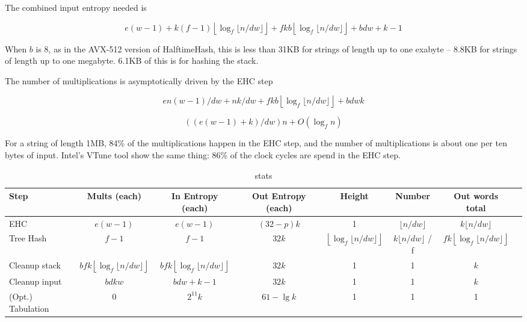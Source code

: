 \documentclass[sigconf, nonacm]{acmart}
\begin{document}
The combined input entropy needed is

\[
e(w-1)
+ k(f-1)\left\lfloor\log_f \lfloor n/dw\rfloor\right\rfloor
+ f k b \left\lfloor\log_f \lfloor n/dw\rfloor\right\rfloor
+ b d w + k - 1
\]

When $b$ is 8, as in the AVX-512 version of HalftimeHash, this is less than 31KB for strings of length up to one exabyte -- 8.8KB for strings of length up to one megabyte.
6.1KB of this is for hashing the stack.

The number of multiplications is asymptotically driven by the EHC step

\[
en(w-1)/dw + nk/dw + f k b \left\lfloor\log_f \lfloor n/dw\rfloor\right\rfloor + b d w k
\]

\[
((e(w-1) + k)/dw)n + O(\log_f n)
\]

For a string of length 1MB, 84\% of the multiplications happen in the EHC step, and the number of multiplications is about one per ten bytes of input.
Intel's VTune tool show the same thing: 86\% of the clock cycles are spend in the EHC step.

\begin{table*}
\begin{tabular}{|l|c|c|c|c|c|c|c|}
  \hline {\bf Step} & {\bf Mults (each)} & {\bf In Entropy (each)} & {\bf Out Entropy (each)} & {\bf Height} & {\bf Number} & {\bf Out words total}\\
  \hline EHC & $e(w-1)$ & $e(w-1)$ & $(32-p)k$ & 1 & $\lfloor n/dw \rfloor$ & $k \lfloor n/dw \rfloor$ \\
  \hline Tree Hash & $f-1$ & $f-1$ & $32k$ & $\left\lfloor\log_f\lfloor n/d w \rfloor\right\rfloor$ & $k \lfloor n / d w \rfloor$ / f & $f k \left\lfloor\log_f\lfloor n/d w \rfloor\right\rfloor$ \\
  \hline Cleanup stack & $b f k \left\lfloor\log_f\lfloor n/d w \rfloor\right\rfloor$ & $b f k \left\lfloor\log_f\lfloor n/d w \rfloor\right\rfloor$ & $32k$ & 1 & 1 & $k$ \\
  \hline Cleanup input & $b d k w$ &  $b d w + k - 1$ & $32k$ & 1 & 1 & $k$ \\
  \hline (Opt.) Tabulation & 0 &  $2^{11}k$ & $61 - \lg k$ & 1 & 1 & 1 \\
  \hline
\end{tabular}
\caption{\label{analysis-table}stats}
\end{table*}
\end{document}
